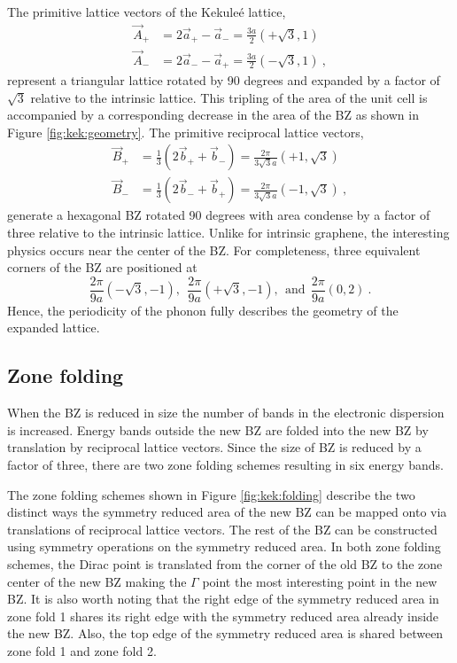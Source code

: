 The primitive lattice vectors of the Kekule\'e lattice,
\begin{align*}
	\vec{A}_+&=2 \vec{a}_+-\vec{a}_-=\frac{3 a}{2} (+\sqrt{3},1) \\
	\vec{A}_-&=2 \vec{a}_--\vec{a}_+=\frac{3 a}{2} (-\sqrt{3},1) \ ,
\end{align*}
represent a triangular lattice rotated by 90 degrees and expanded by a factor of $\sqrt{3}$ relative to the intrinsic lattice.
This tripling of the area of the unit cell is accompanied by a corresponding decrease in the area of the BZ as shown in Figure \ref{fig:kek:geometry}.
The primitive reciprocal lattice vectors,
\begin{align*}
	\vec{B}_+&=\frac{1}{3} (2\vec{b}_+ + \vec{b}_-)=\frac{2 \pi}{3 \sqrt{3} a}(+1,\sqrt{3}) \\
	\vec{B}_-&=\frac{1}{3} (2\vec{b}_- + \vec{b}_+)=\frac{2 \pi}{3 \sqrt{3} a}(-1,\sqrt{3}) \ ,
\end{align*}
generate a hexagonal BZ rotated 90 degrees with area condense by a factor of three relative to the intrinsic lattice.
Unlike for intrinsic graphene, the interesting physics occurs near the center of the BZ.
For completeness, three equivalent corners of the BZ are positioned at
\begin{equation*}
	\frac{2 \pi}{9 a} (-\sqrt{3},-1), \ \ \frac{2 \pi}{9 a} (+\sqrt{3},-1), \ \ \textrm{and} \ \  \frac{2 \pi}{9 a} (0,2) \ .
\end{equation*}
Hence, the periodicity of the phonon fully describes the geometry of the expanded lattice.

\subsection{Zone folding}
When the BZ is reduced in size the number of bands in the electronic dispersion is increased.
Energy bands outside the new BZ are folded into the new BZ by translation by reciprocal lattice vectors.
Since the size of BZ is reduced by a factor of three, there are two zone folding schemes resulting in six energy bands.

The zone folding schemes shown in Figure \ref{fig:kek:folding} describe the two distinct ways the symmetry reduced area of the new BZ can be mapped onto via translations of reciprocal lattice vectors.
The rest of the BZ can be constructed using symmetry operations on the symmetry reduced area.
In both zone folding schemes, the Dirac point is translated from the corner of the old BZ to the zone center of the new BZ making the $\Gamma$ point the most interesting point in the new BZ.
It is also worth noting that the right edge of the symmetry reduced area in zone fold 1 shares its right edge with the symmetry reduced area already inside the new BZ.
Also, the top edge of the symmetry reduced area is shared between zone fold 1 and zone fold 2.

